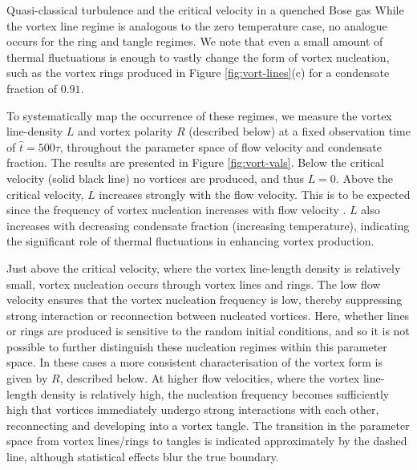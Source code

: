 \begin{chapter}{\label{cha:nonequib}Quasi-classical turbulence and the critical velocity in a quenched Bose gas}
While the vortex line regime is analogous to the zero temperature case, no analogue occurs for the ring and tangle regimes.   We note that even a small amount of thermal fluctuations is enough to vastly change the form of vortex nucleation, such as the vortex rings produced in Figure \ref{fig:vort-lines}(c) for a condensate fraction of $0.91$.

To systematically map the occurrence of these regimes, we measure the vortex line-density $L$ and vortex polarity $R$ (described below) at a fixed observation time of $\hat{t}=500\tau$, throughout the parameter space of flow velocity and condensate fraction.  The results are presented in Figure \ref{fig:vort-vals}.  Below the critical velocity (solid black line) no vortices are produced, and thus $L=0$.  Above the critical velocity, $L$ increases strongly with the flow velocity.  This is to be expected since the frequency of vortex nucleation increases with flow velocity \cite{frisch92}.  $L$ also increases with decreasing condensate fraction (increasing temperature), indicating the significant role of thermal fluctuations in enhancing vortex production.

Just above the critical velocity, where the vortex line-length density is relatively small, vortex nucleation occurs through vortex lines and rings.  The low flow velocity ensures that the vortex nucleation frequency is low, thereby suppressing strong interaction or reconnection between nucleated vortices.  Here, whether lines or rings are produced is sensitive to the random initial conditions, and so it is not possible to further distinguish these nucleation regimes within this parameter space. In these cases a more consistent characterisation of the vortex form is given by $R$, described below.   At higher flow velocities, where the vortex line-length density is relatively high, the nucleation frequency becomes sufficiently high that vortices immediately undergo strong interactions with each other, reconnecting and developing into a vortex tangle.  The transition in the parameter space from vortex lines/rings to tangles is indicated approximately by the dashed line, although statistical effects blur the true boundary.


\end{chapter}
